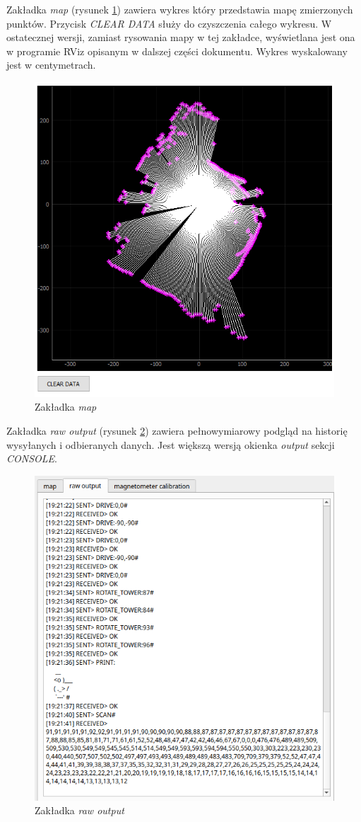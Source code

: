 Zakładka \emph{map} (rysunek \ref{fig:main-app-map-section}) zawiera wykres który przedstawia mapę zmierzonych punktów. Przycisk \emph{CLEAR DATA} służy do czyszczenia całego wykresu. W ostatecznej wersji, zamiast rysowania mapy w tej zakładce, wyświetlana jest ona w programie RViz opisanym w dalszej części dokumentu. Wykres wyskalowany jest w centymetrach.
\begin{figure}[ht]
	\centering
		\includegraphics[width=0.8\linewidth]{rys/main-app-view-map.PNG}
	\caption{Zakładka \emph{map}}
	\label{fig:main-app-map-section}
\end{figure}

Zakładka \emph{raw output} (rysunek \ref{fig:main-app-raw-output-section}) zawiera pełnowymiarowy podgląd na historię wysyłanych i odbieranych danych. Jest większą wersją okienka \emph{output} sekcji \emph{CONSOLE}.
\begin{figure}[ht]
	\centering
		\includegraphics[width=0.8\linewidth]{rys/main-app-view-raw-output.PNG}
	\caption{Zakładka \emph{raw output}}
	\label{fig:main-app-raw-output-section}
\end{figure}

